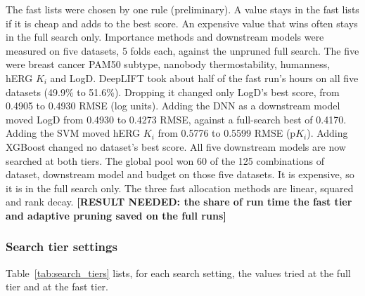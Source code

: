 The fast lists were chosen by one rule (preliminary). A value stays in the fast lists if it is cheap and adds to the best score. An expensive value that wins often stays in the full search only. Importance methods and downstream models were measured on five datasets, 5 folds each, against the unpruned full search. The five were breast cancer PAM50 subtype, nanobody thermostability, humanness, hERG $K_i$ and LogD. DeepLIFT took about half of the fast run's hours on all five datasets (49.9\% to 51.6\%). Dropping it changed only LogD's best score, from 0.4905 to 0.4930 RMSE (log units). Adding the DNN as a downstream model moved LogD from 0.4930 to 0.4273 RMSE, against a full-search best of 0.4170. Adding the SVM moved hERG $K_i$ from 0.5776 to 0.5599 RMSE (p$K_i$). Adding XGBoost changed no dataset's best score. All five downstream models are now searched at both tiers. The global pool won 60 of the 125 combinations of dataset, downstream model and budget on those five datasets. It is expensive, so it is in the full search only. The three fast allocation methods are linear, squared and rank decay. \textbf{[RESULT NEEDED: the share of run time the fast tier and adaptive pruning saved on the full runs]}

\subsubsection{Search tier settings}

Table~\ref{tab:search_tiers} lists, for each search setting, the values tried at the full tier and at the fast tier.

